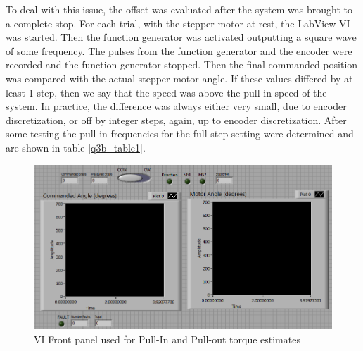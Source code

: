 \documentclass{article}
\theoremstyle{plain}
\theoremstyle{definition}
\theoremstyle{remark}
\begin{document}
To deal with this issue, the offset was evaluated after the system was brought to a complete stop. For each trial, with the stepper motor at rest, the LabView VI was started.  Then the function generator was activated outputting a square wave of some frequency.  The pulses from the function generator and the encoder were recorded and the function generator stopped.  Then the final commanded position was compared with the actual stepper motor angle.  If these values differed by at least 1 step, then we say that the speed was above the pull-in speed of the system.  In practice, the difference was always either very small, due to encoder discretization, or off by integer steps, again, up to encoder discretization.  After some testing the pull-in frequencies for the full step setting were determined and are shown in table \ref{q3b_table1}.


\begin{figure}[htb]
\begin{center}
\includegraphics[width = 13cm]{ExternalSourceFront.png}
\caption{VI Front panel used for Pull-In and Pull-out torque estimates}
\label{q3b_Front}
\end{center}
\end{figure}
\end{document}
